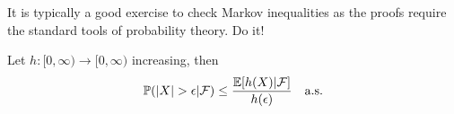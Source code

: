 It is typically a good exercise to check Markov inequalities as the proofs require the standard tools of probability theory. Do it!
\begin{luebung}
Let $h:[0,\infty)\to [0,\infty)$ increasing, then
\begin{align*}
	\P(|X|>\epsilon|\mathcal F)\leq \frac{\E[h(X)|\mathcal F]}{h(\epsilon)}\quad \text{a.s.}
\end{align*}
\end{luebung}




